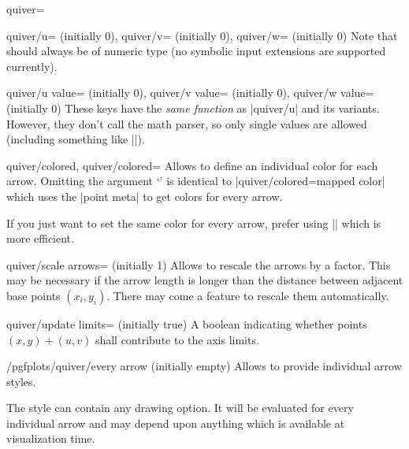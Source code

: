 {\begin{plottype}[/pgfplots]{quiver=%
    \textcolor{black}{}%
}
\begin{pgfplotskeylist}{%
        quiver/u= (initially 0),
        quiver/v= (initially 0),
        quiver/w= (initially 0)%
    }
        Note that  should always be of numeric type (no
        symbolic input extensions are supported currently).
    \end{pgfplotskeylist}

    \begin{pgfplotskeylist}{%
        quiver/u value= (initially 0),
        quiver/v value= (initially 0),
        quiver/w value= (initially 0)%
    }
        These keys have the \emph{same function} as |quiver/u| and its
        variants. However, they don't call the math parser, so only single
        values are allowed (including something like ||).
    \end{pgfplotskeylist}

    \begin{pgfplotskeylist}{%
        quiver/colored,
        quiver/colored=%
    }
        Allows to define an individual color for each arrow. Omitting the
        argument `' is identical to |quiver/colored=mapped color|
        which uses the |point meta| to get colors for every arrow.

        If you just want to set the same color for every arrow, prefer using
        || which is more efficient.
    \end{pgfplotskeylist}

    \begin{pgfplotskey}{quiver/scale arrows= (initially 1)}
        Allows to rescale the arrows by a factor. This may be necessary if the
        arrow length is longer than the distance between adjacent base points
        $(x_i,y_i)$. There may come a feature to rescale them automatically.
    \end{pgfplotskey}

    \begin{pgfplotskey}{quiver/update limits= (initially true)}
        A boolean indicating whether points $(x,y) + (u,v)$ shall contribute
        to the axis limits.
    \end{pgfplotskey}

    \begin{stylekey}{/pgfplots/quiver/every arrow (initially empty)}
        Allows to provide individual arrow styles.

        The style can contain any \Tikz{} drawing option. It will be evaluated
        for every individual arrow and may depend upon anything which is
        available at visualization time.


\end{stylekey}
\end{plottype}}
